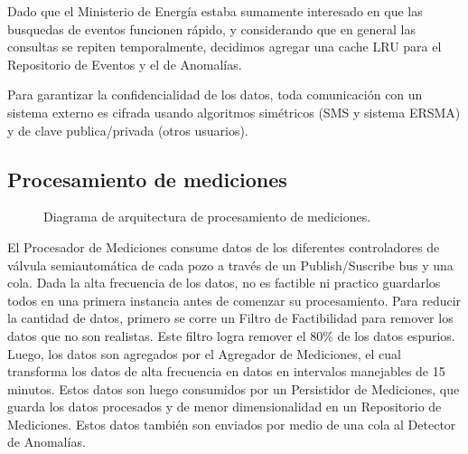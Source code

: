 \documentclass{article}
\theoremstyle{definition}
\theoremstyle{remark}
\begin{document}
Dado que el Ministerio de Energía estaba sumamente interesado en que las busquedas de eventos funcionen rápido, y considerando que en general las consultas se repiten temporalmente, decidimos agregar una cache LRU para el Repositorio de Eventos y el de Anomalías.

Para garantizar la confidencialidad de los datos, toda comunicación con un sistema externo es cifrada usando algoritmos simétricos (SMS y sistema ERSMA) y de clave publica/privada (otros usuarios).

\subsection{Procesamiento de mediciones}  \label{procesador_mediciones}

\begin{figure}[H]
  \caption{Diagrama de arquitectura de procesamiento de mediciones.}
\end{figure}

El Procesador de Mediciones consume datos de los diferentes controladores de válvula semiautomática de cada pozo a través de un Publish/Suscribe bus y una cola. Dada la alta frecuencia de los datos, no es factible ni practico guardarlos todos en una primera instancia antes de comenzar su procesamiento. Para reducir la cantidad de datos, primero se corre un Filtro de Factibilidad para remover los datos que no son realistas. Este filtro logra remover el 80\% de los datos espurios. Luego, los datos son agregados por el Agregador de Mediciones, el cual transforma los datos de alta frecuencia en datos en intervalos manejables de 15 minutos. Estos datos son luego consumidos por un Persistidor de Mediciones, que guarda los datos procesados y de menor dimensionalidad en un Repositorio de Mediciones. Estos datos también son enviados por medio de una cola al Detector de Anomalías.
\end{document}
